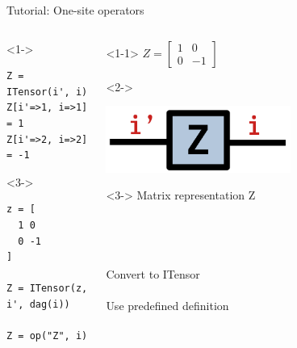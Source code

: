 \begin{frame}[fragile]{Tutorial: One-site operators}

\begin{columns}

\begin{column}{4.5cm}

\begin{onlyenv}<1->
\begin{lstlisting}[language=JuliaLocal, style=julia, basicstyle=\small]
Z = ITensor(i', i)
Z[i'=>1, i=>1] = 1
Z[i'=>2, i=>2] = -1
\end{lstlisting}
\end{onlyenv}

\begin{onlyenv}<3->
\begin{lstlisting}[language=JuliaLocal, style=julia, basicstyle=\small]
z = [
  1 0
  0 -1
]

Z = ITensor(z, i', dag(i))

Z = op("Z", i)
\end{lstlisting}
\end{onlyenv}

\end{column}

\begin{column}{4.5cm}

\begin{onlyenv}<1-1>
$Z = \begin{bmatrix} 1 & 0 \\ 0 & -1 \end{bmatrix}$
\end{onlyenv}

\begin{onlyenv}<2->
\begin{center}
\includegraphics[width=0.6\textwidth]{
  slides/assets/Z.png
}
\end{center}
\vspace*{1.0cm}
\end{onlyenv}

\begin{onlyenv}<3->
Matrix representation Z \\
~\\
~\\
~\\
~\\
Convert to ITensor \\
~\\
Use predefined definition
\end{onlyenv}

\end{column}

\end{columns}

\end{frame}
